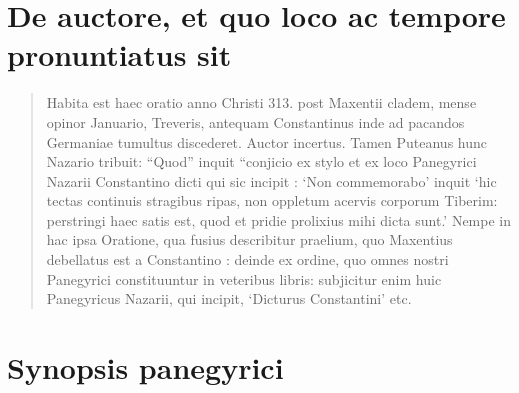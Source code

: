 
\section*{De auctore, et quo loco ac tempore pronuntiatus sit} 

\begin{quotation}
\noindent Habita est haec oratio anno Christi 313. post Maxentii cladem, mense opinor Januario, Treveris, antequam Constantinus inde ad pacandos Germaniae tumultus discederet. Auctor incertus. Tamen Puteanus hunc Nazario tribuit: ``Quod'' inquit ``conjicio ex stylo et ex loco Panegyrici Nazarii Constantino dicti qui sic incipit : `Non commemorabo' inquit `hic tectas continuis stragibus ripas, non oppletum acervis corporum Tiberim: perstringi haec satis est, quod et pridie prolixius mihi dicta sunt.' Nempe in hac ipsa Oratione, qua fusius describitur praelium, quo Maxentius debellatus est a Constantino : deinde ex ordine, quo omnes nostri Panegyrici constituuntur in veteribus libris: subjicitur enim huic Panegyricus Nazarii, qui incipit, `Dicturus Constantini' etc.
\end{quotation}

\section*{Synopsis panegyrici}

